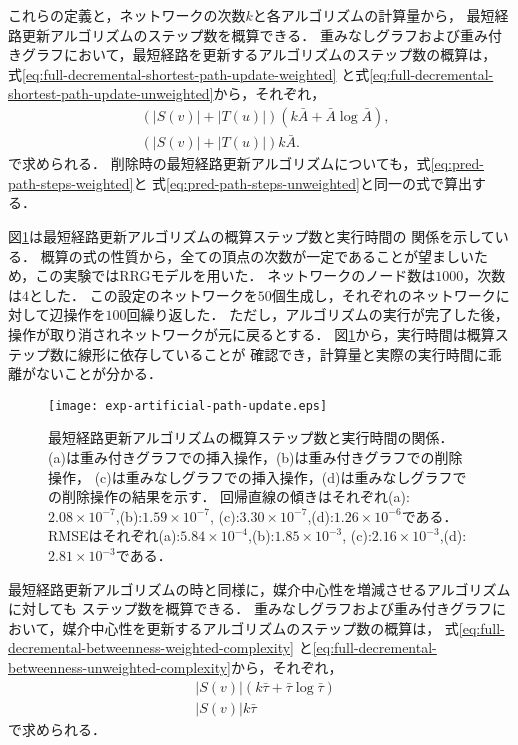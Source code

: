 これらの定義と，ネットワークの次数$k$と各アルゴリズムの計算量から，
最短経路更新アルゴリズムのステップ数を概算できる．
重みなしグラフおよび重み付きグラフにおいて，最短経路を更新するアルゴリズムのステップ数の概算は，
式\eqref{eq:full-decremental-shortest-path-update-weighted}
と式\eqref{eq:full-decremental-shortest-path-update-unweighted}から，それぞれ，
\begin{align}
  &(|S(v)|+|T(u)|)(k\bar{A}+\bar{A}\log\bar{A}),
  \label{eq:pred-path-steps-weighted} \\
  &(|S(v)|+|T(u)|)k\bar{A}.
  \label{eq:pred-path-steps-unweighted}
\end{align}
で求められる．
削除時の最短経路更新アルゴリズムについても，式\ref{eq:pred-path-steps-weighted}と
式\ref{eq:pred-path-steps-unweighted}と同一の式で算出する．

図\ref{fig:exp-artificial-path-update}は最短経路更新アルゴリズムの概算ステップ数と実行時間の
関係を示している．
概算の式の性質から，全ての頂点の次数が一定であることが望ましいため，この実験ではRRGモデルを用いた．
ネットワークのノード数は$1000$，次数は$4$とした．
この設定のネットワークを$50$個生成し，それぞれのネットワークに対して辺操作を$100$回繰り返した．
ただし，アルゴリズムの実行が完了した後，操作が取り消されネットワークが元に戻るとする．
図\ref{fig:exp-artificial-path-update}から，実行時間は概算ステップ数に線形に依存していることが
確認でき，計算量と実際の実行時間に乖離がないことが分かる．

\begin{figure}
  \centering
  \texttt{[image: exp-artificial-path-update.eps]}
  \caption{
    最短経路更新アルゴリズムの概算ステップ数と実行時間の関係．
    (a)は重み付きグラフでの挿入操作，(b)は重み付きグラフでの削除操作，
    (c)は重みなしグラフでの挿入操作，(d)は重みなしグラフでの削除操作の結果を示す．
    回帰直線の傾きはそれぞれ(a):$2.08\times10^{-7}$,(b):$1.59\times10^{-7}$,
    (c):$3.30\times10^{-7}$,(d):$1.26\times10^{-6}$である．
    RMSEはそれぞれ(a):$5.84\times10^{-4}$,(b):$1.85\times10^{-3}$,
    (c):$2.16\times10^{-3}$,(d):$2.81\times10^{-3}$である．
  }
  \label{fig:exp-artificial-path-update}
\end{figure}

最短経路更新アルゴリズムの時と同様に，媒介中心性を増減させるアルゴリズムに対しても
ステップ数を概算できる．
重みなしグラフおよび重み付きグラフにおいて，媒介中心性を更新するアルゴリズムのステップ数の概算は，
式\eqref{eq:full-decremental-betweenness-weighted-complexity}
と\eqref{eq:full-decremental-betweenness-unweighted-complexity}から，それぞれ，
\begin{align}
  &|S(v)|(k\bar{\tau}+\bar{\tau}\log\bar{\tau})
  \label{eq:pred-betw-steps-weighted} \\
  &|S(v)|k\bar{\tau}
  \label{eq:pred-betw-steps-unweighted}
\end{align}
で求められる．

